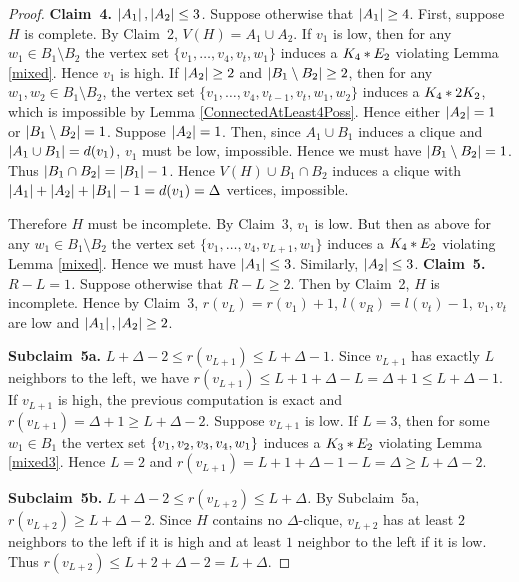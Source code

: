 \begin{proof}
\textbf{Claim~4.} \textit{$\left|A_1\right|, \left|A_2\right| \leq 3$.}  Suppose otherwise that
$\left|A_1\right| \geq 4$.  First, suppose $H$ is complete.  By Claim~2, $V(H) = A_1
\cup A_2$. If $v_1$ is low, then for any $w_1 \in
B_1 \setminus B_2$ the vertex set $\{v_1, \ldots, v_4, v_t, w_1\}$ induces
a $K_4 \mbox{\hspace{2 pt}$\ast$\hspace{2 pt}} E_2$ violating Lemma \ref{mixed}.  Hence $v_1$ is high. If
$\left|A_2\right| \geq 2$ and $\left|B_1 \setminus B_2\right| \geq 2$, 
then for any $w_1, w_2 \in B_1 \setminus B_2$, the vertex set $\{v_1, \ldots, v_4, v_{t-1}, v_t, w_1, w_2\}$ induces
a $K_4 \mbox{\hspace{2 pt}$\ast$\hspace{2 pt}} 2K_2$, which is impossible by Lemma \ref{ConnectedAtLeast4Poss}. 
Hence either $\left|A_2\right| = 1$ or $\left|B_1 \setminus B_2\right| = 1$.  Suppose
$\left|A_2\right| = 1$.  Then, since $A_1 \cup B_1$ induces a clique and $\left|A_1
\cup B_1\right| = d(v_1)$, $v_1$ must be low, impossible.    Hence we must have
$\left|B_1 \setminus B_2\right| = 1$.  Thus $\left|B_1 \cap B_2\right| = \left|B_1\right| - 1$. 
Hence $V(H) \cup B_1 \cap B_2$ induces a clique with $\left|A_1\right| + \left|A_2\right| +
\left|B_1\right| - 1 = d(v_1) = \Delta$ vertices, impossible.

Therefore $H$ must be incomplete.  By Claim~3, $v_1$ is low.  But then as above
for any $w_1 \in B_1 \setminus B_2$ the vertex set $\{v_1, \ldots, v_4, v_{L+1}, w_1\}$ induces
a $K_4 \mbox{\hspace{2 pt}$\ast$\hspace{2 pt}} E_2$ violating Lemma \ref{mixed}.  Hence we must have $\left|A_1\right|
\leq 3$.  Similarly, $\left|A_2\right| \leq 3$.
\textbf{Claim~5.} \textit{$R - L = 1$.}  Suppose otherwise that $R - L \geq 2$.  Then
by Claim~2, $H$ is incomplete.  Hence by Claim~3, $r(v_L) = r(v_1) + 1$,
$l(v_R) = l(v_t) - 1$, $v_1, v_t$ are low and $\left|A_1\right|, \left|A_2\right| \geq 2$.

\textbf{Subclaim~5a.} \textit{$L + \Delta - 2 \leq r(v_{L+1}) \leq L + \Delta - 1$.}
Since $v_{L+1}$ has exactly $L$ neighbors to the left, we have $r(v_{L+1}) \leq L + 1 + \Delta - L =
\Delta + 1 \leq L + \Delta - 1$.  If $v_{L+1}$ is high, the previous computation
is exact and $r(v_{L+1}) = \Delta + 1 \geq L + \Delta - 2$.  Suppose $v_{L+1}$
is low. If $L=3$, then for some $w_1 \in B_1$ the vertex set $\left\{ v_1, v_2, v_3, v_4, w_1 \right\}$ induces a
$K_3 \mbox{\hspace{2 pt}$\ast$\hspace{2 pt}} E_2$ violating Lemma \ref{mixed3}.  Hence $L=2$ and $r(v_{L+1})
= L + 1 + \Delta - 1 - L = \Delta \geq L + \Delta - 2$.

\textbf{Subclaim~5b.} \textit{$L + \Delta - 2 \leq r(v_{L+2}) \leq L + \Delta$.}  By
Subclaim~5a, $r(v_{L+2}) \geq L + \Delta - 2$.  Since $H$ contains no
$\Delta$-clique, $v_{L+2}$ has at least $2$ neighbors to the left if it is high
and at least $1$ neighbor to the left if it is low.  Thus $r(v_{L+2}) \leq L + 2
+ \Delta - 2 = L + \Delta$.


\end{proof}
